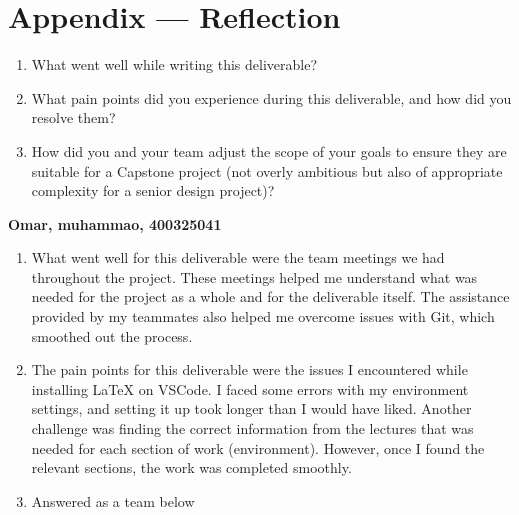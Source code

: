 \documentclass{article}
\begin{document}

\newpage{}

\section*{Appendix --- Reflection}




\begin{enumerate}
    \item What went well while writing this deliverable? 
    \item What pain points did you experience during this deliverable, and how
    did you resolve them?
    \item How did you and your team adjust the scope of your goals to ensure
    they are suitable for a Capstone project (not overly ambitious but also of
    appropriate complexity for a senior design project)?
\end{enumerate}  

\textbf{Omar, muhammao, 400325041} 
\begin{enumerate}
\item What went well for this deliverable were the team meetings we had throughout the project. These meetings helped me understand what was needed for the project as a whole and for the deliverable itself. The assistance provided by my teammates also helped me overcome issues with Git, which smoothed out the process.
\item The pain points for this deliverable were the issues I encountered while installing LaTeX on VSCode. I faced some errors with my environment settings, and setting it up took longer than I would have liked. Another challenge was finding the correct information from the lectures that was needed for each section of work (environment). However, once I found the relevant sections, the work was completed smoothly.
\item Answered as a team below
\end{enumerate}  
\end{document}
